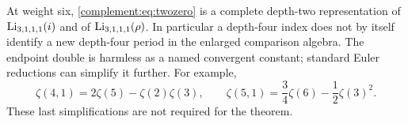 At weight six, \eqref{complement:eq:twozero} is a complete depth-two representation
of $\operatorname{Li}_{3,1,1,1}(i)$ and of $\operatorname{Li}_{3,1,1,1}(\rho)$.
In particular a depth-four index does not by itself identify a new
depth-four period in the enlarged comparison algebra.
The endpoint double is harmless as a named convergent constant;
standard Euler reductions can simplify it further. For example,
\[
 \zeta(4,1)=2\zeta(5)-\zeta(2)\zeta(3),\qquad
 \zeta(5,1)=\frac34\zeta(6)-\frac12\zeta(3)^2.
\]
These last simplifications are not required for the theorem.

